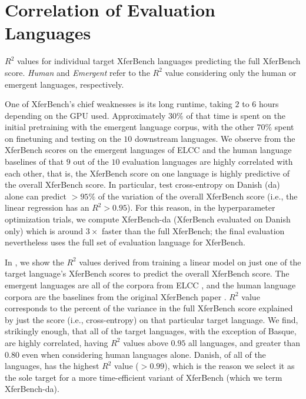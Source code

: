 \section{Correlation of Evaluation Languages}
\unskip\label{hpo:sec:eval-corr}

\begin{table}
  \centering
  \caption{$R^2$ values for individual target XferBench languages predicting the full XferBench score.  \emph{Human} and \emph{Emergent} refer to the $R^2$ value considering only the human or emergent languages, respectively.}
  \unskip\label{tab:target-corr}
\end{table}
One of XferBench's chief weaknesses is its long runtime, taking $2$ to $6$ hours depending on the GPU used.
Approximately $30\%$ of that time is spent on the initial pretraining with the emergent language corpus, with the other $70\%$ spent on finetuning and testing on the $10$ downstream languages.
We observe from the XferBench scores on the emergent languages of ELCC and the human language baselines of \citet{boldt-mortensen-2024-xferbench} that $9$ out of the $10$ evaluation languages are highly correlated with each other, that is, the XferBench score on one language is highly predictive of the overall XferBench score.
In particular, test cross-entropy on Danish (da) alone can predict ${>}95\%$ of the variation of the overall XferBench score (i.e., the linear regression has an $R^2>0.95$).
For this reason, in the hyperparameter optimization trials, we compute XferBench-da (XferBench evaluated on Danish only) which is around $3{\times}$ faster than the full XferBench; the final evaluation nevertheless uses the full set of evaluation language for XferBench.

In , we show the $R^2$ values derived from training a linear model on just one of the target language's XferBench scores to predict the overall XferBench score.
The emergent languages are all of the corpora from ELCC \citep{elcc}, and the human language corpora are the baselines from the original XferBench paper \citep{boldt-mortensen-2024-xferbench}.
$R^2$ value corresponds to the percent of the variance in the full XferBench score explained by just the score (i.e., cross-entropy) on that particular target language.
We find, strikingly enough, that all of the target languages, with the exception of Basque, are highly correlated, having $R^2$ values above $0.95$ all languages, and greater than $0.80$ even when considering human languages alone.
Danish, of all of the languages, has the highest $R^2$ value (${>}0.99$), which is the reason we select it as the sole target for a more time-efficient variant of XferBench (which we term XferBench-da).


